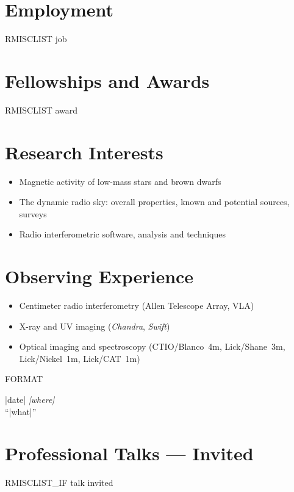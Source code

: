\documentclass[letterpaper,11pt]{article}
\newlength{\mainindent} \setlength{\mainindent}{12pt}
\newlength{\contentindent} \setlength{\contentindent}{19ex}
\newenvironment{datelist}{
  \begingroup
  \raggedright
  \begin{description}[labelindent=\mainindent,leftmargin=\contentindent,
      style=sameline,font=\normalfont,topsep=0pt,partopsep=0pt,parsep=0pt,
      itemsep=4pt]
}{
  \end{description}
  \endgroup
}
\begin{document}
\section*{Employment}
\begin{datelist}
RMISCLIST job
\end{datelist}

\section*{Fellowships and Awards}
\begin{datelist}
RMISCLIST award
\end{datelist}

\section*{Research Interests}
\begin{itemize}
\item Magnetic activity of low-mass stars and brown dwarfs
\item The dynamic radio sky: overall properties, known and potential sources,
    surveys
\item Radio interferometric software, analysis and techniques
\end{itemize}

\section*{Observing Experience}
\begin{itemize}
\item Centimeter radio interferometry (Allen Telescope Array, VLA)
\item X-ray and UV imaging (\textit{Chandra}, \textit{Swift})
\item Optical imaging and spectroscopy (CTIO/Blanco~4m, Lick/Shane~3m,
    Lick/Nickel~1m, Lick/CAT~1m)
\end{itemize}

FORMAT \item[|date|] \emph{|where|} \\ ``|what|''

\section*{Professional Talks --- Invited}
\begin{datelist}
RMISCLIST_IF talk invited
\end{datelist}
\end{document}

